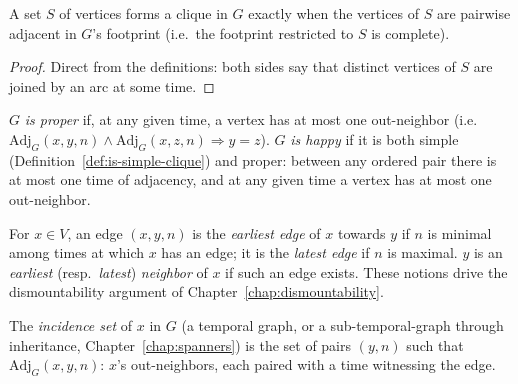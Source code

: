 \begin{lemma}
  \label{lem:isClique-iff-footprint-complete}
  \leanok
  A set $S$ of vertices forms a clique in $G$ exactly when the vertices of $S$
  are pairwise adjacent in $G$'s footprint (i.e.\ the footprint restricted to
  $S$ is complete).
\end{lemma}

\begin{proof}
  \leanok
  Direct from the definitions: both sides say that distinct vertices of $S$ are joined by an arc at some time.
\end{proof}

\begin{definition}
  \label{def:is-proper-happy}
  \leanok
  $G$ \emph{is proper} if, at any given time, a vertex has at most one
  out-neighbor (i.e.\ $\mathrm{Adj}_G(x,y,n) \wedge \mathrm{Adj}_G(x,z,n)
  \Rightarrow y = z$). $G$ \emph{is happy} if it is both simple
  (Definition~\ref{def:is-simple-clique}) and proper: between any ordered
  pair there is at most one time of adjacency, and at any given time a
  vertex has at most one out-neighbor.
\end{definition}

\begin{definition}
  \label{def:earliest-latest-neighbor}
  \leanok
  For $x \in V$, an edge $(x,y,n)$ is the \emph{earliest edge} of $x$ towards
  $y$ if $n$ is minimal among times at which $x$ has an edge; it is the
  \emph{latest edge} if $n$ is maximal. $y$ is an \emph{earliest} (resp.\
  \emph{latest}) \emph{neighbor} of $x$ if such an edge exists. These notions
  drive the dismountability argument of Chapter~\ref{chap:dismountability}.
\end{definition}

\begin{definition}
  \label{def:incidence-set}
  \leanok
  The \emph{incidence set} of $x$ in $G$ (a temporal graph, or a
  sub-temporal-graph through inheritance, Chapter~\ref{chap:spanners}) is the
  set of pairs $(y,n)$ such that $\mathrm{Adj}_G(x,y,n)$: $x$'s out-neighbors,
  each paired with a time witnessing the edge.
\end{definition}

